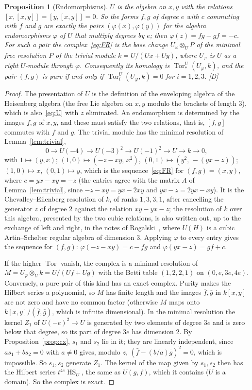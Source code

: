 \documentclass[11pt]{article}
\newtheorem{proposition}{Proposition}
\theoremstyle{definition}
\theoremstyle{remark}
\newcommand{\Tor}{\operatorname{Tor}}
\newcommand{\Hilb}{\operatorname{HS}}
\begin{document}
\begin{proposition}[Endomorphisms]\label{prop:endo}
$U$ is the algebra on $x,y$ with the relations $[x,[x,y]]=[y,[x,y]]=0$. So the forms $f,g$ of degree $e$ with $c$ commuting with $f$ and $g$ are exactly the pairs $(\varphi(x),\varphi(y))$ for the algebra endomorphisms $\varphi$ of $U$ that multiply degrees by $e$; then $\varphi(z)=fg-gf=-c$. For such a pair the complex~\eqref{eq:FR} is the base change $U_\varphi\otimes_UP$ of the minimal free resolution $P$ of the trivial module $k=U/(Ux+Uy)$, where $U_\varphi$ is $U$ as a right $U$-module through $\varphi$. Consequently its homology is $\Tor^U_*(U_\varphi,k)$, and the pair $(f,g)$ is pure if and only if $\Tor_i^U(U_\varphi,k)=0$ for $i=1,2,3$. [D]
\end{proposition}
\begin{proof}
The presentation of $U$ is the definition of the enveloping algebra of the Heisenberg algebra (the free Lie algebra on $x,y$ modulo the brackets of length $3$), which is also~\eqref{eq:U} with $z$ eliminated. An endomorphism is determined by the images $f,g$ of $x,y$, and these must satisfy the two relations, that is, $[f,g]$ commutes with $f$ and $g$. The trivial module has the minimal resolution of Lemma~\ref{lem:trivial},
\[
0\to U(-4)\to U(-3)^2\to U(-1)^2\to U\to k\to0,
\]
with $1\mapsto(y,x)$; $(1,0)\mapsto(-z-xy,\,x^2)$, $(0,1)\mapsto(y^2,\,-(yx-z))$; $(1,0)\mapsto x$, $(0,1)\mapsto y$, which is the sequence~\eqref{eq:FR} for $(f,g)=(x,y)$, where $c=yx-xy=-z$ (the entries agree with the matrix $A$ of Lemma~\ref{lem:trivial}, since $-z-xy=yx-2xy$ and $yx-z=2yx-xy$). It is the Chevalley--Eilenberg resolution of $k$, of ranks $1,3,3,1$, after cancelling the generator $z$ of degree $2$ against the relation $xy-yx-z$; the resolution of $k$ over this algebra, presented by the two cubic relations, is also written out, up to the exchange of left and right, in the notes of Rogalski~\cite[exercise set~2]{Rogalski}, where $U(H)$ is a cubic Artin--Schelter regular algebra of dimension $3$. Applying $\varphi$ to every entry gives the sequence for $(f,g)$: $\varphi(-z-xy)=c-fg$ and $\varphi(yx-z)=gf+c$.

If the higher $\Tor$ vanish, the complex is a minimal resolution of $M=U_\varphi\otimes_Uk=U/(Uf+Ug)$ with the Betti table $(1,2,2,1)$ on $(0,e,3e,4e)$. Conversely, a pure pair of this kind has an exact complex. Purity makes the Hilbert series a polynomial, so $M$ has finite length and the images $\bar f,\bar g$ in $k[x,y]$ are not zero and have no common factor (otherwise $M$ maps onto $k[x,y]/(\bar f,\bar g)$, which is infinite dimensional). In the minimal resolution the kernel $Z_1$ of $U(-e)^2\to U$ is generated by two elements of degree $3e$ and is zero below that degree, so its part of degree $3e$ has dimension $2$. By Proposition~\ref{prop:cx}, $s_1$ and $s_2$ lie in it; they are linearly independent, since $as_1+bs_2=0$ with $a\ne0$ gives, modulo $z$, $(\bar f-(b/a)\bar g)^2=0$, which is impossible. So $s_1,s_2$ generate $Z_1$. The kernel of the map given by $s_1,s_2$ then has the Hilbert series $t^{4e}\Hilb_U$, the same as $U(g,f)$, which it contains ($U$ is a domain). So the complex is exact.
\end{proof}
\end{document}
